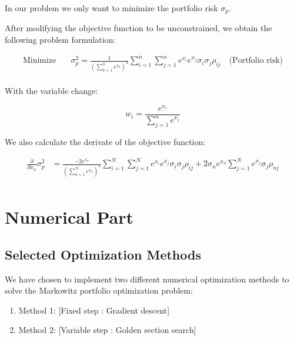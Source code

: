 \documentclass[12pt]{article}
\begin{document}
In our problem we only want to minimize the portfolio risk $\sigma_p$.



After modifying the objective function to be unconstrained, we obtain the following problem formulation:

\begin{equation}
    \begin{aligned}
        \text{Minimize} \quad   & \sigma_p^2 = \frac{1}{(\sum_{k=1}^{n} e^{x_k})^{2}} \sum_{i=1}^{n}\sum_{j=1}^{n} e^{x_i} e^{x_j}\sigma_i \sigma_j \rho_{ij} \quad \text{(Portfolio risk)} \\
    \end{aligned}
\end{equation}

With the variable change:

\begin{equation}
    w_i = \frac{e^{x_i}}{\sum_{j=1}^{n} e^{x_j}}
\end{equation}

We also calculate the derivate of the objective function:

\begin{equation}
    \begin{aligned}
        \frac{\partial}{\partial x_n} \sigma_p^2 & = \frac{-2 e^{x_n}}{(\sum_{k=1}^{N} e^{x_k})^{3}} \sum_{i=1}^{N}\sum_{j=1}^{N} e^{x_i} e^{x_j}\sigma_i \sigma_j \rho_{ij} + 2 \sigma_n e^{x_n} \sum_{j=1}^{N} e^{x_j}\sigma_j \rho_{nj} \\
    \end{aligned}
\end{equation}

\section*{Numerical Part}

\subsection*{Selected Optimization Methods}

We have chosen to implement two different numerical optimization methods to solve the Markowitz portfolio optimization problem:


\begin{enumerate}
    \item Method 1: [Fixed step : Gradient descent]
    \item Method 2: [Variable step : Golden section search]
\end{enumerate}
\end{document}
